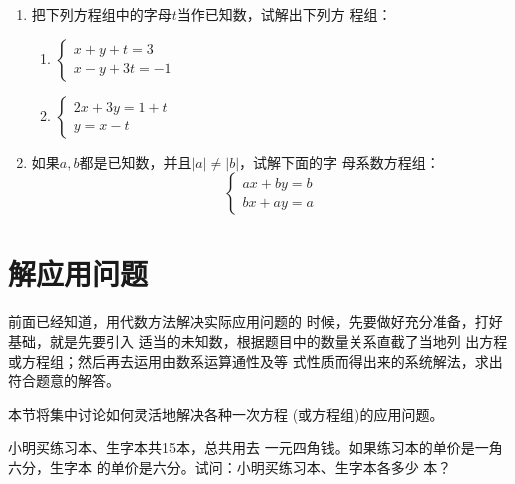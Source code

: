 \begin{enumerate}
\item 把下列方程组中的字母$t$当作已知数，试解出下列方
程组：
\begin{multicols}{2}
    \begin{enumerate}
\item $\begin{cases}
    x+y+t=3\\ x-y+3t=-1
\end{cases}$
\item $\begin{cases}
    2x+3y=1+t\\ y=x-t
\end{cases}$
\end{enumerate}
\end{multicols}

\item 如果$a,b$都是已知数，并且$|a|\ne |b|$，试解下面的字
母系数方程组：
\[\begin{cases}
    ax+by=b\\ bx+ay=a
\end{cases} \]
\end{enumerate}


\section{解应用问题}
    前面已经知道，用代数方法解决实际应用问题的
时候，先要做好充分准备，打好基础，就是先要引入
适当的未知数，根据题目中的数量关系直截了当地列
出方程或方程组；然后再去运用由数系运算通性及等
式性质而得出来的系统解法，求出符合题意的解答。

    本节将集中讨论如何灵活地解决各种一次方程
  (或方程组)的应用问题。

    
\begin{example}
    小明买练习本、生字本共15本，总共用去
一元四角钱。如果练习本的单价是一角六分，生字本
的单价是六分。试问：小明买练习本、生字本各多少
本？
\end{example}

